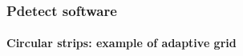 \documentclass[14pt]{beamer}
\begin{document}
{
\begin{frame}
  \frametitle{Pdetect software}
  \framesubtitle{Circular strips: example of adaptive grid}


\end{frame}
}
%
%
%
%
%
%
%
\end{document}

